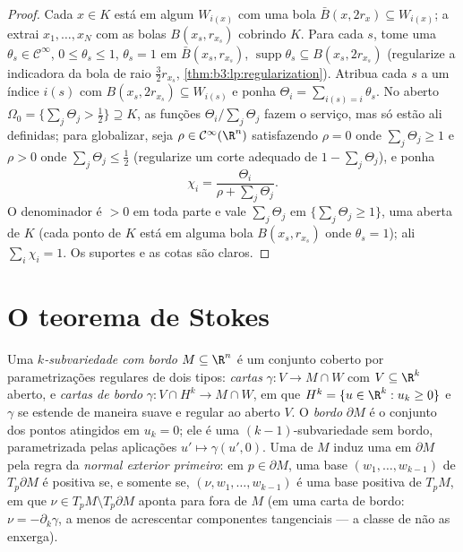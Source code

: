 \begin{proof}
Cada $x \in K$ está em algum $W_{i(x)}$ com uma bola  $\bar B(x, 2r_x) \subseteq W_{i(x)}$; a 
extrai $x_1, \dots, x_N$ com as bolas $B(x_s, r_{x_s})$ cobrindo $K$. Para cada $s$, tome
uma  $\theta_s \in \mathcal
C^\infty$, $0 \leq \theta_s \leq 1$, $\theta_s = 1$ em $\bar B(x_s, r_{x_s})$, $\operatorname{supp}\theta_s
\subseteq B(x_s, 2r_{x_s})$ (regularize a
indicadora da bola de raio $\frac32r_{x_s}$, \cref{thm:b3:lp:regularization}). Atribua cada $s$
a um índice $i(s)$ com $B(x_s, 2r_{x_s}) \subseteq W_{i(s)}$ e ponha $\Theta_i = \sum_{i(s) = i}\theta_s$. No aberto $\Omega_0 = \{\sum_j\Theta_j > \tfrac12\} \supseteq K$, as
funções $\Theta_i/\sum_j\Theta_j$ fazem o serviço, mas só estão ali definidas; para
globalizar, seja $\rho \in \mathcal
C^\infty(\R^n)$ satisfazendo $\rho = 0$ onde $\sum_j\Theta_j
\geq 1$ e $\rho > 0$ onde $\sum_j\Theta_j \leq \tfrac12$
(regularize um corte adequado de $1 - \sum_j\Theta_j$), e ponha
\[
\chi_i = \frac{\Theta_i}{\rho + \sum_j\Theta_j} .
\]
O denominador é $> 0$ em toda parte e vale $\sum_j\Theta_j$ em $\{\sum_j\Theta_j \geq 1\}$, uma
 aberta de $K$ (cada ponto de $K$ está em alguma bola
$B(x_s, r_{x_s})$ onde $\theta_s = 1$); ali $\sum_i\chi_i = 1$. Os suportes e as cotas são claros.
\end{proof}

\section{O teorema de Stokes}

\begin{definition}\label{def:b3:forms:boundary}
Uma \emph{$k$-subvariedade com bordo}
$M \subseteq \R^n$ é um conjunto coberto por parametrizações regulares de dois tipos:
\emph{cartas } $\gamma\colon V \to M \cap W$ com $V \subseteq \R^k$ aberto, e \emph{cartas de
bordo} $\gamma\colon V \cap H^k \to M
\cap W$, em que $H^k = \{u \in \R^k : u_k \geq 0\}$ e $\gamma$ se estende de maneira suave e
regular ao aberto $V$. O \emph{bordo} $\partial M$ é o conjunto dos pontos
atingidos em $u_k = 0$; ele é uma $(k-1)$-subvariedade sem bordo,
parametrizada pelas aplicações $u' \mapsto \gamma(u',
0)$. Uma  de $M$ induz uma
em $\partial M$ pela regra da \emph{normal exterior primeiro}: em $p \in \partial M$, uma
base $(w_1, \dots, w_{k-1})$ de $T_p\partial M$ é positiva se, e somente se, $(\nu, w_1, \dots, w_{k-1})$ é uma base
positiva de $T_pM$, em que $\nu \in T_pM \setminus T_p\partial M$ aponta para fora de $M$ (em uma
carta de bordo: $\nu =
-\partial_k\gamma$, a menos de acrescentar componentes tangenciais
--- a classe de  não as enxerga).
\end{definition}

